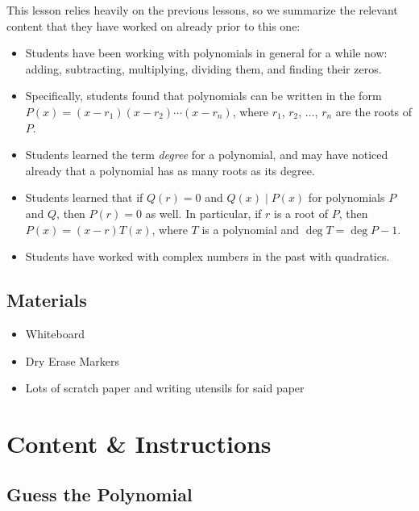 This lesson relies heavily on the previous lessons, so we summarize the relevant content that they have worked on already prior to this one:
\begin{itemize}
    \item Students have been working with polynomials in general for a while now: adding, subtracting, multiplying, dividing them, and finding their zeros.
    \item Specifically, students found that polynomials can be written in the form $P(x) = (x-r_1)(x-r_2)\cdots (x-r_n)$, where $r_1$, $r_2$, $\dots$, $r_n$ are the roots of $P$.
    \item Students learned the term \textit{degree} for a polynomial, and may have noticed already that a polynomial has as many roots as its degree.
    \item Students learned that if $Q(r) = 0$ and $Q(x) \mid P(x)$ for polynomials $P$ and $Q$, then $P(r) = 0$ as well. In particular, if $r$ is a root of $P$, then $P(x) = (x-r)T(x)$, where $T$ is a polynomial and $\deg T = \deg P - 1$.
    \item Students have worked with complex numbers in the past with quadratics.
\end{itemize}

\subsection{Materials}

\begin{itemize}
    \item Whiteboard
    \item Dry Erase Markers
    \item Lots of scratch paper and writing utensils for said paper
\end{itemize}

\section{Content \& Instructions}

\subsection{Guess the Polynomial}

